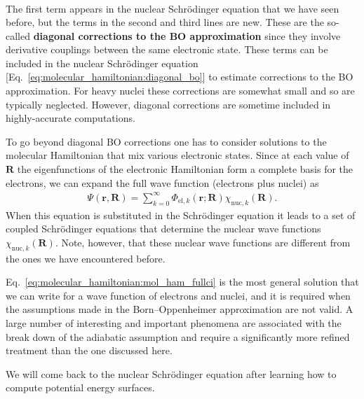 \documentclass[../Main/chem532-notes.tex]{subfiles}
\begin{document}
\begin{details}
\begin{equation}
\begin{split}
\end{split}
\end{equation}
The first term appears in the nuclear Schr\"{o}dinger equation that we have seen before, but the terms in the second and third lines are new.
These are the so-called \textbf{diagonal corrections to the BO approximation} since they involve derivative couplings between the same electronic state.
These terms can be included in the nuclear Schr\"{o}dinger equation [Eq.~\eqref{eq:molecular_hamiltonian:diagonal_bo}] to estimate corrections to the BO approximation.
For heavy nuclei these corrections are somewhat small and so are typically neglected. 
However, diagonal corrections are sometime included in highly-accurate computations.

To go beyond diagonal BO corrections one has to consider solutions to the molecular Hamiltonian that mix various electronic states.
Since at each value of $\mathbf{R}$ the eigenfunctions of the electronic Hamiltonian form a complete basis for the electrons, we can expand the full wave function (electrons plus nuclei) as
\begin{equation}
\label{eq:molecular_hamiltonian:mol_ham_fullci}
\begin{split}
\Psi(\mathbf{r},\mathbf{R}) = \sum_{k=0}^\infty \Phi_{\mathrm{el},k}(\mathbf{r};\mathbf{R}) \chi_{\mathrm{nuc},k}(\mathbf{R}).
\end{split}
\end{equation}
When this equation is substituted in the Schr\"{o}dinger equation it leads to a set of coupled Schr\"{o}dinger  equations that determine the nuclear wave functions $\chi_{\mathrm{nuc},k}(\mathbf{R})$.
Note, however, that these nuclear wave functions are different from the ones we have encountered before.

Eq.~\eqref{eq:molecular_hamiltonian:mol_ham_fullci}  is the most general solution that we can write for a wave function of electrons and nuclei, and it is required when the assumptions made in the Born--Oppenheimer approximation are not valid.
A large number of interesting and important phenomena are associated with the break down of the adiabatic assumption and require a significantly more refined treatment than the one discussed here.
\end{details}
We will come back to the nuclear Schr\"{o}dinger equation after learning how to compute potential energy surfaces.
%
\end{document}
